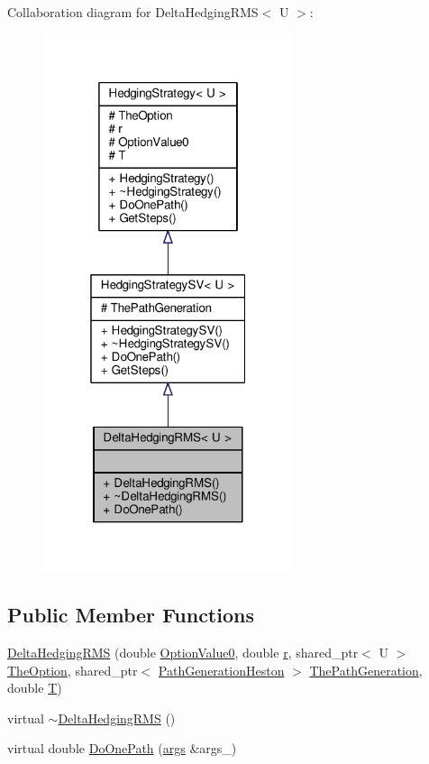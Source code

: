 Collaboration diagram for Delta\+Hedging\+R\+MS$<$ U $>$\+:
\nopagebreak
\begin{figure}[H]
\begin{center}
\leavevmode
\includegraphics[width=208pt]{classDeltaHedgingRMS__coll__graph}
\end{center}
\end{figure}
\subsection*{Public Member Functions}
\begin{DoxyCompactItemize}
\item 
\hyperlink{classDeltaHedgingRMS_a5b31d762316b99c787328394d28d90a0}{Delta\+Hedging\+R\+MS} (double \hyperlink{classHedgingStrategy_ac96528e9f4e5a0d1e5aadcc2ebdcab55}{Option\+Value0}, double \hyperlink{classHedgingStrategy_a313da7bc1911dba2a166d2c7bed5f1d7}{r}, shared\+\_\+ptr$<$ U $>$ \hyperlink{classHedgingStrategy_a65699a183423af9d947bb939ae8e907d}{The\+Option}, shared\+\_\+ptr$<$ \hyperlink{classPathGenerationHeston}{Path\+Generation\+Heston} $>$ \hyperlink{classHedgingStrategySV_aa341650c5b2846606e59e3e6c6225aca}{The\+Path\+Generation}, double \hyperlink{classHedgingStrategy_aedb4069f0709b49482a72b9d9c906a5e}{T})
\item 
virtual \hyperlink{classDeltaHedgingRMS_a5d94af75ab8235dd533b5225ce7964e1}{$\sim$\+Delta\+Hedging\+R\+MS} ()
\item 
virtual double \hyperlink{classDeltaHedgingRMS_ad1dfe5625f1064b9b1f8a45b20f0ee50}{Do\+One\+Path} (\hyperlink{path__generation_8h_a75c13cde2074f502cc4348c70528572d}{args} \&args\+\_\+)
\end{DoxyCompactItemize}
